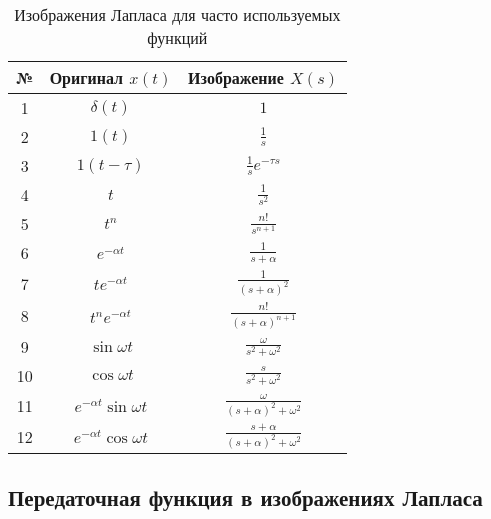 \documentclass[../../TAU.tex]{subfiles}
\begin{document}
    \begin{table}[H]
        \begin{center}
            \begin{tabular}{|c|c|c|}
            \hline 
            № & Оригинал $x(t)$ & Изображение $X(s)$\\ \hline
            1 & $\delta(t)$ & $1$ \\ \hline
            2 & $1(t)$ & $\frac{1}{s}$ \\ \hline
            3 & $1(t-\tau)$ & $\frac{1}{s} e^{-\tau s}$ \\ \hline
            4 & $t$ & $\frac{1}{s^2}$ \\ \hline
            5 & $t^n$ & $\frac{n!}{s^{n+1}}$ \\ \hline
            6 & $e^{-\alpha t}$ & $\frac{1}{s+\alpha}$ \\ \hline
            7 & $t e^{-\alpha t}$ & $\frac{1}{(s+\alpha)^2}$ \\ \hline
            8 & $t^n e^{-\alpha t}$ & $\frac{n!}{(s+\alpha)^{n+1}}$ \\ \hline
            9 & $\sin{\omega t}$ & $\frac{\omega}{s^2 + \omega^2}$ \\ \hline
            10 & $\cos{\omega t}$ & $\frac{s}{s^2+\omega^2}$ \\ \hline
            11 & $e^{-\alpha t} \sin{\omega t}$ & $\frac{\omega}{(s+\alpha)^2+\omega^2}$ \\ \hline
            12 & $e^{-\alpha t} \cos{\omega t}$ & $\frac{s+\alpha}{(s+\alpha)^2+\omega^2}$ \\ \hline
            \end{tabular}
            \caption{Изображения Лапласа для часто используемых функций}
        \end{center}
    \end{table}
 
 \subsection{Передаточная функция в изображениях Лапласа}
\end{document}
